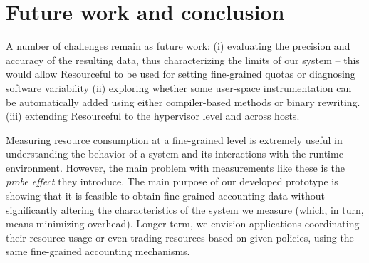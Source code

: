 \documentclass[12pt,twoside,a4paper]{article}
\newcommand{\pname}{Resourceful}
\begin{document}



\section{Future work and conclusion} 
A number of challenges remain as future work: (i) evaluating the precision and
accuracy of the resulting data, thus characterizing the limits of our system -- this
would allow \pname{ }to be used for setting fine-grained quotas or diagnosing
software variability (ii) exploring whether some user-space instrumentation can
be automatically added using either compiler-based methods or binary rewriting.
(iii) extending \pname{ } to the hypervisor level and across hosts.

Measuring resource consumption at a fine-grained level is extremely useful in
understanding the behavior of a system and its interactions with the runtime
environment. However, the main problem with measurements like these is the
\emph{probe effect} they introduce. The main purpose of our developed prototype
is showing that it is feasible to obtain fine-grained accounting data without
significantly altering the characteristics of the system we measure (which, in
turn, means minimizing overhead). Longer term, we envision applications
coordinating their resource usage or even trading resources based on given
policies, using the same fine-grained accounting mechanisms.


{\footnotesize  }
\end{document}
